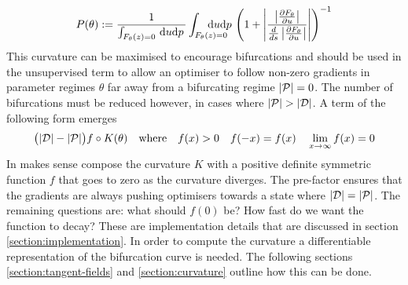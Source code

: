 \begin{align}
    P(\theta):=\frac{1}{\int_{\rates(z)=0}\!\
    \mathrm{d}u\mathrm{d}p\,}
    \int_{\rates(z)=0}\!\!\!\!\!\!\!\!\!\!\!\!
    \mathrm{d}u\mathrm{d}p\,
    \left(1+\left|\frac{\Det}{\frac{d}{ds}\Det}\right|\right)^{-1}
    \label{eq:curvature}
\end{align}
This curvature can be maximised to encourage bifurcations and should be used in the unsupervised term to allow an optimiser to follow non-zero gradients in parameter regimes $\theta$ far away from a bifurcating regime $|\mathcal{P}|=0$. The number of bifurcations must be reduced however, in cases where $|\predictions|>|\targets|$. A term of the following form emerges
\begin{align}
    \big(|\mathcal{D}|-|\mathcal{P}|\big)f \circ K(\theta)
    \quad\mathrm{where}\quad f(x)> 0 \quad f(-x)=f(x)\quad\lim_{x\rightarrow\infty}f(x)=0
\end{align}
In makes sense compose the curvature $K$ with a positive definite symmetric function $f$ that goes to zero as the curvature diverges. The pre-factor ensures that the gradients are always pushing optimisers towards a state where $|\mathcal{D}|=|\mathcal{P}|$. The remaining questions are: what should $f(0)$ be? How fast do we want the function to decay? These are implementation details that are discussed in section \ref{section:implementation}. In order to compute the curvature a differentiable representation of the bifurcation curve is needed. The following sections \ref{section:tangent-fields} and \ref{section:curvature} outline how this can be done.



